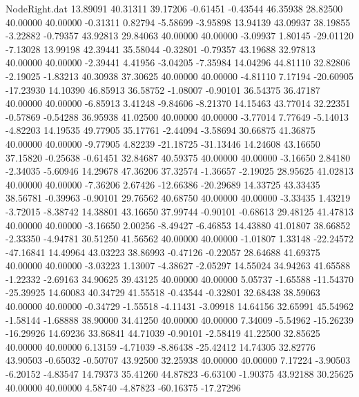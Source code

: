 \begin{filecontents}{NodeRight.dat}
  13.89091   40.31311   39.17206    -0.61451   -0.43544   46.35938   28.82500   40.00000   40.00000   -0.31311    0.82794   -5.58699   -3.95898
  13.94139   43.09937   38.19855    -3.22882   -0.79357   43.92813   29.84063   40.00000   40.00000   -3.09937    1.80145  -29.01120   -7.13028
  13.99198   42.39441   35.58044    -0.32801   -0.79357   43.19688   32.97813   40.00000   40.00000   -2.39441    4.41956   -3.04205   -7.35984
  14.04296   44.81110   32.82806    -2.19025   -1.83213   40.30938   37.30625   40.00000   40.00000   -4.81110    7.17194  -20.60905  -17.23930
  14.10390   46.85913   36.58752    -1.08007   -0.90101   36.54375   36.47187   40.00000   40.00000   -6.85913    3.41248   -9.84606   -8.21370
  14.15463   43.77014   32.22351    -0.57869   -0.54288   36.95938   41.02500   40.00000   40.00000   -3.77014    7.77649   -5.14013   -4.82203
  14.19535   49.77905   35.17761    -2.44094   -3.58694   30.66875   41.36875   40.00000   40.00000   -9.77905    4.82239  -21.18725  -31.13446
  14.24608   43.16650   37.15820    -0.25638   -0.61451   32.84687   40.59375   40.00000   40.00000   -3.16650    2.84180   -2.34035   -5.60946
  14.29678   47.36206   37.32574    -1.36657   -2.19025   28.95625   41.02813   40.00000   40.00000   -7.36206    2.67426  -12.66386  -20.29689
  14.33725   43.33435   38.56781    -0.39963   -0.90101   29.76562   40.68750   40.00000   40.00000   -3.33435    1.43219   -3.72015   -8.38742
  14.38801   43.16650   37.99744    -0.90101   -0.68613   29.48125   41.47813   40.00000   40.00000   -3.16650    2.00256   -8.49427   -6.46853
  14.43880   41.01807   38.66852    -2.33350   -4.94781   30.51250   41.56562   40.00000   40.00000   -1.01807    1.33148  -22.24572  -47.16841
  14.49964   43.03223   38.86993    -0.47126   -0.22057   28.64688   41.69375   40.00000   40.00000   -3.03223    1.13007   -4.38627   -2.05297
  14.55024   34.94263   41.65588    -1.22332   -2.69163   34.90625   39.43125   40.00000   40.00000    5.05737   -1.65588  -11.54370  -25.39925
  14.60083   40.34729   41.55518    -0.43544   -0.32801   32.68438   38.59063   40.00000   40.00000   -0.34729   -1.55518   -4.11431   -3.09918
  14.64156   32.65991   45.54962    -1.58144   -1.68888   38.90000   34.41250   40.00000   40.00000    7.34009   -5.54962  -15.26239  -16.29926
  14.69236   33.86841   44.71039    -0.90101   -2.58419   41.22500   32.85625   40.00000   40.00000    6.13159   -4.71039   -8.86438  -25.42412
  14.74305   32.82776   43.90503    -0.65032   -0.50707   43.92500   32.25938   40.00000   40.00000    7.17224   -3.90503   -6.20152   -4.83547
  14.79373   35.41260   44.87823    -6.63100   -1.90375   43.92188   30.25625   40.00000   40.00000    4.58740   -4.87823  -60.16375  -17.27296

\end{filecontents}
